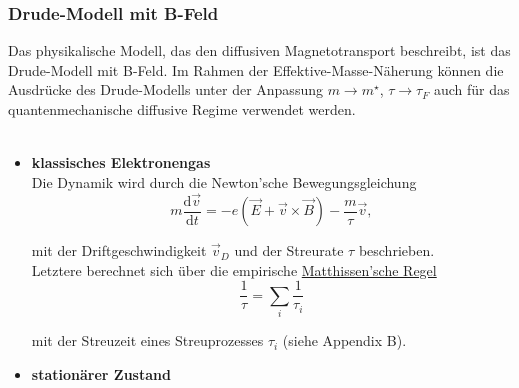 \documentclass{article}
\newcommand{\diff}{\mathrm{d}}
\begin{document}
\subsubsection{Drude-Modell mit B-Feld}
Das physikalische Modell, das den diffusiven Magnetotransport beschreibt, ist das Drude-Modell mit B-Feld. Im Rahmen der Effektive-Masse-Näherung können die Ausdrücke des Drude-Modells unter der Anpassung $m \to m^\star$, $\tau \to \tau_F$ auch für das quantenmechanische diffusive Regime verwendet werden. \\
\\
	\begin{itemize}
		\item \textbf{klassisches Elektronengas}\\
		Die Dynamik wird durch die Newton'sche Bewegungsgleichung
			\begin{equation}
				m \frac{\diff \vec{v}}{\diff t} = -e(\vec{E} + \vec{v} \times \vec{B} ) - \frac{m}{\tau}\vec{v},
			\end{equation}
		
		mit der Driftgeschwindigkeit $\vec{v}_D$ und der Streurate $\tau$ beschrieben.\\
		Letztere berechnet sich über die empirische \underline{Matthissen'sche Regel}
			\begin{equation}
				\frac{1}{\tau} = \sum_i \frac{1}{\tau_i}
			\end{equation}
		
		mit der Streuzeit eines Streuprozesses $\tau_i$ (siehe Appendix B).
		
		
		\item \textbf{stationärer Zustand}
	\end{itemize}
	
\end{document}
